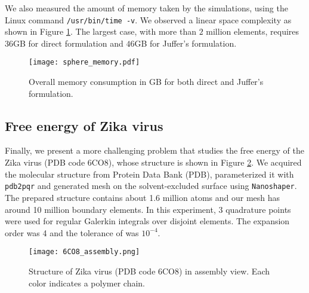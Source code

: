 We also measured the amount of memory taken by the simulations, using the Linux command \texttt{/usr/bin/time -v}.
We observed a linear space complexity as shown in Figure \ref{fig:sphere_memory}.
The largest case, with more than $2$ million elements, requires $36$GB for direct formulation and $46$GB for Juffer's formulation.

\begin{figure}[htbp]
    \centering
    \texttt{[image: sphere\_memory.pdf]} 
    \caption{Overall memory consumption in GB for both direct and Juffer's formulation.}
    \label{fig:sphere_memory}
\end{figure}

\subsection{Free energy of Zika virus}

Finally, we present a more challenging problem that studies the free energy of the Zika virus (PDB code 6CO8), whose structure is shown in Figure \ref{fig:6CO8_assembly}.
We acquired the molecular structure from Protein Data Bank (PDB), parameterized it with \texttt{pdb2pqr} and generated mesh on the solvent-excluded surface using \texttt{Nanoshaper}.
The prepared structure contains about 1.6 million atoms and our mesh has around 10 million boundary elements.
In this experiment, 3 quadrature points were used for regular Galerkin integrals over disjoint elements.
The \fmm expansion order was 4 and the tolerance of \gmres was $10^{-4}$.

\begin{figure}[htbp]
    \centering
    \texttt{[image: 6CO8\_assembly.png]} 
    \caption{Structure of Zika virus (PDB code 6CO8) in assembly view. Each color indicates a polymer chain.}
    \label{fig:6CO8_assembly}
\end{figure}

